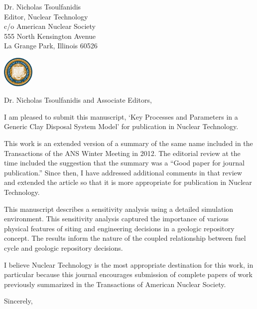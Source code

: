 \documentclass{letter}
\begin{document}
%
%


 \begin{letter}{Dr. Nicholas Tsoulfanidis\\
      Editor, Nuclear Technology\\
      c/o American Nuclear Society\\
      555 North Kensington Avenue\\
      La Grange Park, Illinois 60526
   }
   \begin{center}
     \includegraphics[height=1.5cm]{berkeleylogo.png}
   \end{center}
    \opening{Dr. Nicholas Tsoulfanidis and Associate Editors,}

I am pleased to submit this manuscript, `Key Processes and Parameters in a 
Generic Clay Disposal System Model' for publication in Nuclear Technology. 

This work is an extended version of a summary of the same name included in the 
Transactions of the ANS Winter Meeting in 2012. The editorial review at the time 
included the suggestion that the summary was a ``Good paper for journal 
publication.'' Since then, I have addressed additional comments in that review 
and extended the article so that it is more appropriate for publication in 
Nuclear Technology.  

This manuscript describes a sensitivity analysis using a detailed simulation 
environment. This sensitivity analysis captured the importance of various 
physical features of siting and engineering decisions in a geologic repository 
concept. The results inform the nature of the coupled relationship between fuel 
cycle and geologic repository decisions.

I believe Nuclear Technology is the most appropriate destination for this work, 
in particular because this journal encourages submission of complete papers of 
work previously summarized in the Transactions of American Nuclear Society.

      \closing{Sincerely,}

       \end{letter}
       
\end{document}
